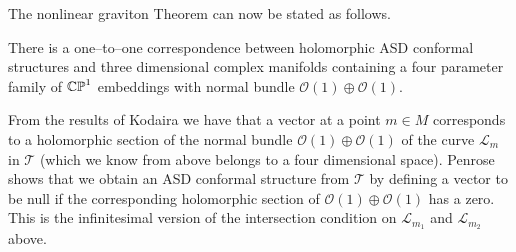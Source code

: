 

The nonlinear graviton Theorem can now be stated as follows.
\begin{theo}
There is a one--to--one correspondence between holomorphic ASD conformal structures and three dimensional complex manifolds containing a four parameter family of $\mathbb{CP}^1$ embeddings with normal bundle $\mathcal{O}(1)\oplus\mathcal{O}(1)$.
\end{theo}
\noindent
From the results of Kodaira \cite{Kodaira} we have that a vector at a point $m\in M$ corresponds to a holomorphic section of the normal bundle $\mathcal{O}(1)\oplus\mathcal{O}(1)$ of the curve $\mathscr{L}_m$ in $\mathscr{T}$ (which we know from above belongs to a four dimensional space). Penrose shows that we obtain an ASD conformal structure from $\mathscr{T}$ by defining a vector to be null if the corresponding holomorphic section of $\mathcal{O}(1)\oplus\mathcal{O}(1)$ has a zero. This is the infinitesimal version of the intersection condition on $\mathscr{L}_{m_1}$ and $\mathscr{L}_{m_2}$ above. %


